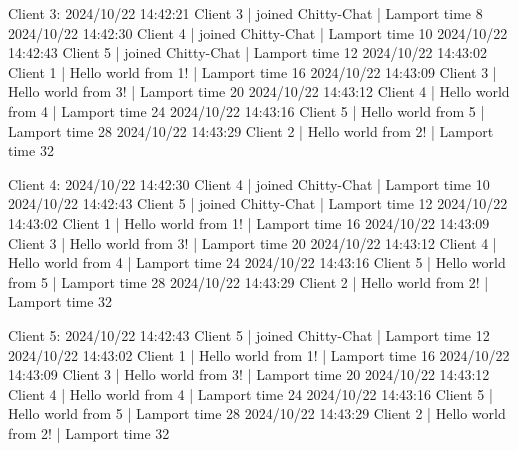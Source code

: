 \documentclass[a4paper,11pt]{article}
\begin{document}
Client 3:
2024/10/22 14:42:21 Client 3 | joined Chitty-Chat | Lamport time 8
2024/10/22 14:42:30 Client 4 | joined Chitty-Chat | Lamport time 10
2024/10/22 14:42:43 Client 5 | joined Chitty-Chat | Lamport time 12
2024/10/22 14:43:02 Client 1 | Hello world from 1! | Lamport time 16
2024/10/22 14:43:09 Client 3 | Hello world from 3! | Lamport time 20
2024/10/22 14:43:12 Client 4 | Hello world from 4 | Lamport time 24
2024/10/22 14:43:16 Client 5 | Hello world from 5 | Lamport time 28
2024/10/22 14:43:29 Client 2 | Hello world from 2! | Lamport time 32

Client 4:
2024/10/22 14:42:30 Client 4 | joined Chitty-Chat | Lamport time 10
2024/10/22 14:42:43 Client 5 | joined Chitty-Chat | Lamport time 12
2024/10/22 14:43:02 Client 1 | Hello world from 1! | Lamport time 16
2024/10/22 14:43:09 Client 3 | Hello world from 3! | Lamport time 20
2024/10/22 14:43:12 Client 4 | Hello world from 4 | Lamport time 24
2024/10/22 14:43:16 Client 5 | Hello world from 5 | Lamport time 28
2024/10/22 14:43:29 Client 2 | Hello world from 2! | Lamport time 32

Client 5:
2024/10/22 14:42:43 Client 5 | joined Chitty-Chat | Lamport time 12
2024/10/22 14:43:02 Client 1 | Hello world from 1! | Lamport time 16
2024/10/22 14:43:09 Client 3 | Hello world from 3! | Lamport time 20
2024/10/22 14:43:12 Client 4 | Hello world from 4 | Lamport time 24
2024/10/22 14:43:16 Client 5 | Hello world from 5 | Lamport time 28
2024/10/22 14:43:29 Client 2 | Hello world from 2! | Lamport time 32
\end{document}
